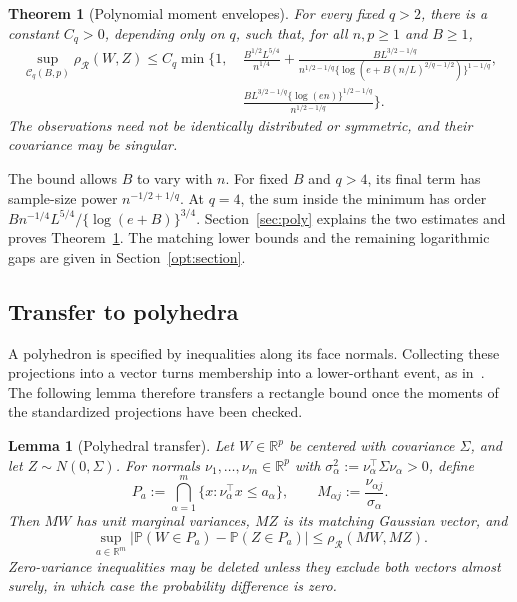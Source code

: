 \documentclass[11pt,letterpaper]{article}
\newtheorem{theorem}{Theorem}
\newtheorem{lemma}{Lemma}
\theoremstyle{remark}
\newcommand{\Pp}{\mathbb P}
\newcommand{\R}{\mathbb R}
\newcommand{\rh}{\rho_{\mathcal R}}
\begin{document}
\begin{theorem}[Polynomial moment envelopes]\label{thm:polynomial}
For every fixed \(q>2\), there is a constant \(C_q>0\), depending
only on \(q\), such that, for all \(n,p\ge1\) and \(B\ge1\),
\begin{equation}
\begin{aligned}
 \sup_{\mathcal C_q(B,p)}\rh(W,Z)
 \le C_q\min\Bigg\{1,\ &
 \frac{B^{1/2}L^{5/4}}{n^{1/4}}
 +\frac{B L^{3/2-1/q}}
 {n^{1/2-1/q}\{\log(e+B(n/L)^{2/q-1/2})\}^{1-1/q}},\\
 &\frac{B L^{3/2-1/q}\{\log(en)\}^{1/2-1/q}}
 {n^{1/2-1/q}}\Bigg\}.
\end{aligned}
 \label{poly:combined}
\end{equation}
The observations need not be identically distributed or symmetric,
and their covariance may be singular.
\end{theorem}

The bound allows \(B\) to vary with \(n\). For fixed \(B\) and
\(q>4\), its final term has sample-size power \(n^{-1/2+1/q}\).
At \(q=4\), the sum inside the minimum has order
\(Bn^{-1/4}L^{5/4}/\{\log(e+B)\}^{3/4}\).
Section~\ref{sec:poly} explains the two estimates and proves
Theorem~\ref{thm:polynomial}. The matching lower bounds and the
remaining logarithmic gaps are given in Section~\ref{opt:section}.

\subsection{Transfer to polyhedra}\label{sec:polyhedral-transfer}

A polyhedron is specified by inequalities along its face normals.
Collecting these projections into a vector turns membership into a
lower-orthant event, as in~\cite[Section~3.1]{CCK2017}. The following
lemma therefore transfers a rectangle bound once the moments of the
standardized projections have been checked.

\begin{lemma}[Polyhedral transfer]\label{lem:polyhedral-transfer}
Let \(W\in\R^p\) be centered with covariance \(\Sigma\), and let
\(Z\sim N(0,\Sigma)\). For normals \(\nu_1,\ldots,\nu_m\in\R^p\)
with \(\sigma_\alpha^2:=\nu_\alpha^\top\Sigma\nu_\alpha>0\), define
\[
 P_a:=\bigcap_{\alpha=1}^m\{x:\nu_\alpha^\top x\le a_\alpha\},
 \qquad
 M_{\alpha j}:=\frac{\nu_{\alpha j}}{\sigma_\alpha}.
\]
Then \(MW\) has unit marginal variances, \(MZ\) is its matching
Gaussian vector, and
\begin{equation}
 \sup_{a\in\R^m}
 \bigl|\Pp(W\in P_a)-\Pp(Z\in P_a)\bigr|
 \le \rh(MW,MZ).
 \label{eq:polyhedral-transfer}
\end{equation}
Zero-variance inequalities may be deleted unless they exclude both
vectors almost surely, in which case the probability difference is zero.
\end{lemma}
\end{document}
